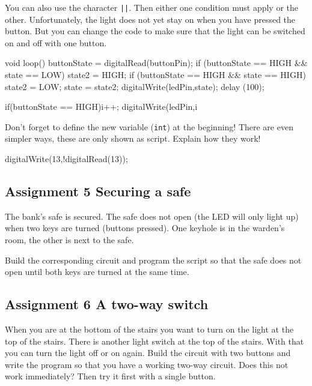 \documentclass{arduino}
\begin{document}
You can also use the character \lstinline{||}. Then either one condition must apply or the other. Unfortunately, the light does not yet stay on when you have pressed the button. But you can change the code to make sure that the light can be switched on and off with one button.

\begin{marginlisting}
void loop() {
  buttonState = digitalRead(buttonPin);
  if (buttonState == HIGH && state == LOW) {
    state2 = HIGH;
    }
  if (buttonState == HIGH && state == HIGH) {
    state2 = LOW;
    }
  state = state2;
  digitalWrite(ledPin,state);
  delay (100);
}
\end{marginlisting}

\begin{marginlisting}
if(buttonState == HIGH){i++;}
digitalWrite(ledPin,i%
\end{marginlisting}
Don't forget to define the new variable (\lstinline{int}) at the beginning! There are even simpler ways, these are only shown as script. Explain how they work!

\begin{marginlisting}
digitalWrite(13,!digitalRead(13));
\end{marginlisting}

\newpage

\subsection{Assignment 5 Securing a safe}

The bank's safe is secured. The safe does not open (the LED will only light up) when two keys are turned (buttons pressed). One keyhole is in the warden's room, the other is next to the safe.

Build the corresponding circuit and program the script so that the safe does not open until both keys are turned at the same time.

\subsection{Assignment 6 A two-way switch}

When you are at the bottom of the stairs you want to turn on the light at the top of the stairs. There is another light switch at the top of the stairs. With that you can turn the light off or on again. Build the circuit with two buttons and write the program so that you have a working two-way circuit. Does this not work immediately? Then try it first with a single button.
\end{document}
